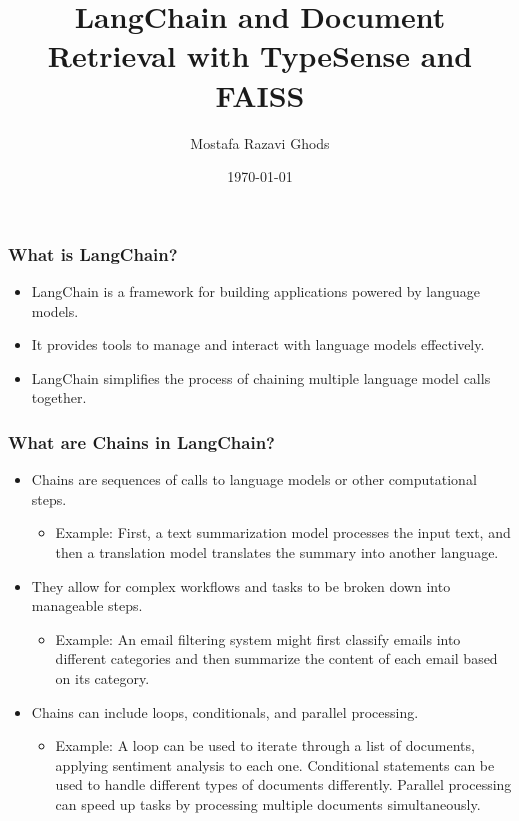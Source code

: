 \documentclass{beamer}
\title{LangChain and Document Retrieval with TypeSense and FAISS}
\author{Mostafa Razavi Ghods}
\date{\today}
\begin{document}
	
	\frame{\titlepage}
	
	\begin{frame}
		\frametitle{What is LangChain?}
		\begin{itemize}
			\item LangChain is a framework for building applications powered by language models.
			\item It provides tools to manage and interact with language models effectively.
			\item LangChain simplifies the process of chaining multiple language model calls together.
		\end{itemize}
	\end{frame}
	
	\begin{frame}
		\frametitle{What are Chains in LangChain?}
		\begin{itemize}
			\item Chains are sequences of calls to language models or other computational steps.
			\begin{itemize}
				\item Example: First, a text summarization model processes the input text, and then a translation model translates the summary into another language.
			\end{itemize}
			\item They allow for complex workflows and tasks to be broken down into manageable steps.
			\begin{itemize}
				\item Example: An email filtering system might first classify emails into different categories and then summarize the content of each email based on its category.
			\end{itemize}
			\item Chains can include loops, conditionals, and parallel processing.
			\begin{itemize}
				\item Example: A loop can be used to iterate through a list of documents, applying sentiment analysis to each one. Conditional statements can be used to handle different types of documents differently. Parallel processing can speed up tasks by processing multiple documents simultaneously.
			\end{itemize}
		\end{itemize}
	\end{frame}
	
\end{document}
